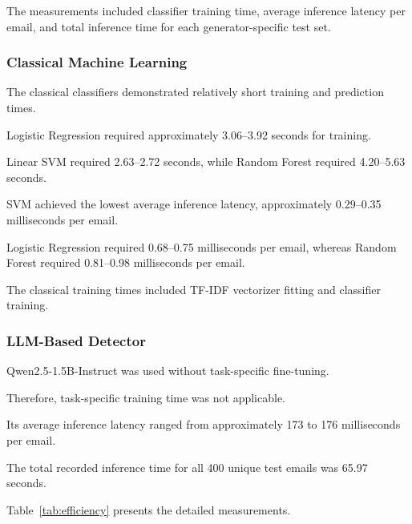 \documentclass[sigconf,nonacm]{acmart}
\begin{document}
The measurements included classifier
training time, average inference latency
per email, and total inference time
for each generator-specific test set.

\subsubsection{Classical Machine Learning}

The classical classifiers demonstrated
relatively short training and prediction
times.

Logistic Regression required approximately
3.06--3.92 seconds for training.

Linear SVM required 2.63--2.72 seconds,
while Random Forest required
4.20--5.63 seconds.

SVM achieved the lowest average inference
latency, approximately
0.29--0.35 milliseconds per email.

Logistic Regression required
0.68--0.75 milliseconds per email,
whereas Random Forest required
0.81--0.98 milliseconds per email.

The classical training times included
TF-IDF vectorizer fitting and classifier
training.

\subsubsection{LLM-Based Detector}

Qwen2.5-1.5B-Instruct was used without
task-specific fine-tuning.

Therefore, task-specific training time
was not applicable.

Its average inference latency ranged
from approximately 173 to 176
milliseconds per email.

The total recorded inference time
for all 400 unique test emails
was 65.97 seconds.

Table~\ref{tab:efficiency} presents
the detailed measurements.
\end{document}
